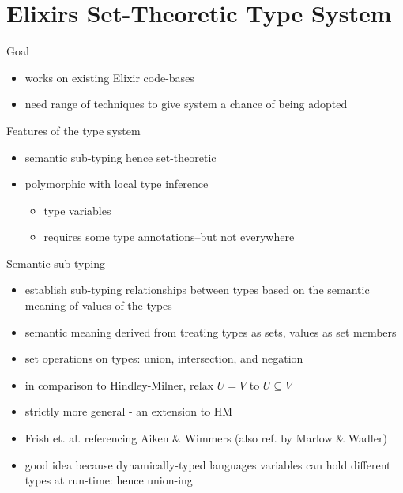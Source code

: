 \documentclass[
  ignorenonframetext,
  aspectratio=169]{beamer}
\providecommand{\tightlist}{%
  \setlength{\itemsep}{0pt}\setlength{\parskip}{0pt}}
\begin{document}
\section{Elixir\textquotesingle s Set-Theoretic Type
System}\label{elixirs-set-theoretic-type-system-7}

\begin{frame}{Goal}
\label{goal}
\begin{itemize}
\tightlist
\item
  works on existing Elixir code-bases
\item
  need range of techniques to give system a chance of being adopted
\end{itemize}
\end{frame}

\begin{frame}{Features of the type system}
\label{features-of-the-type-system}
\begin{itemize}
\tightlist
\item
  semantic sub-typing hence set-theoretic
\item
  polymorphic with local type inference

  \begin{itemize}
  \tightlist
  \item
    type variables
  \item
    requires some type annotations--but not everywhere
  \end{itemize}
\end{itemize}
\end{frame}

\begin{frame}{Semantic sub-typing}
\label{semantic-sub-typing}
\begin{itemize}
\tightlist
\item
  establish sub-typing relationships between types based on the semantic
  meaning of values of the types
\item
  semantic meaning derived from treating types as sets, values as set
  members
\item
  set operations on types: union, intersection, and negation
\item
  in comparison to Hindley-Milner, relax \(U = V\) to \(U \subseteq V\)
\item
  strictly more general - an extension to HM
\item
  Frish et. al. referencing Aiken \& Wimmers (also ref. by Marlow \&
  Wadler)
\item
  good idea because dynamically-typed languages variables can hold
  different types at run-time: hence union-ing
\end{itemize}
\end{frame}
\end{document}
